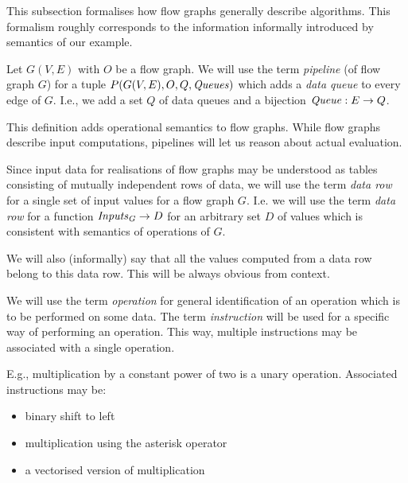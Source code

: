   This subsection formalises how flow graphs generally describe algorithms. This formalism roughly corresponds to the information informally introduced by semantics of our example.


    Let $G(V,E)$ with $O$ be a flow graph. We will use the term \emph{pipeline} (of flow graph $G$) for a tuple $P(G(V,E), O, Q, \mf{queues})$ which adds a \emph{data queue} to every edge of $G$. I.e., we add a set $Q$ of data queues and a bijection $\mf{queue}: E \arrow Q$. 
\myenddef

This definition adds operational semantics to flow graphs. While flow graphs describe input computations, pipelines will let us reason about actual evaluation.


    Since input data for realisations of flow graphs may be understood as tables consisting of mutually independent rows of data, we will use the term \emph{data row} for a single set of input values for a flow graph $G$. I.e. we will use the term \emph{data row} for a function $\mf{inputs_G} \arrow D$ for an arbitrary set $D$ of values which is consistent with semantics of operations of $G$.

  We will also (informally) say that all the values computed from a data row belong to this data row. This will be always obvious from context.
\myenddef


We will use the term \emph{operation} for general identification of an operation which is to be performed on some data. The term \emph{instruction} will be used for a specific way of performing an operation. This way, multiple instructions may be associated with a single operation.
\myenddef

E.g., multiplication by a constant power of two is a unary operation. Associated instructions may be:
\begin{itemize}
  \item binary shift to left
  \item multiplication using the asterisk operator
  \item a vectorised version of multiplication
\end{itemize}

